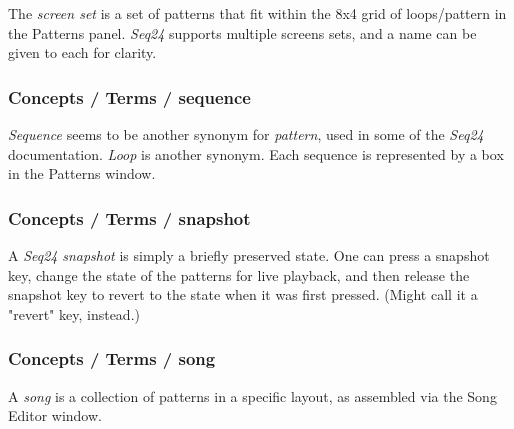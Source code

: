    The \textsl{screen set}
   is a set of patterns that fit within the 8x4 grid of loops/pattern in the
   Patterns panel.
   \textsl{Seq24} supports multiple screens sets, and a name can be given to
   each for clarity.

\subsubsection{Concepts / Terms / sequence}
\label{subsubsec:concepts_terms_sequence}

   \textsl{Sequence} seems to be
   another synonym for \textsl{pattern}, used in some of the \textsl{Seq24}
   documentation.  \textsl{Loop} is another synonym.
   Each sequence is represented by a box in the Patterns window.

\subsubsection{Concepts / Terms / snapshot}
\label{subsubsec:concepts_terms_snapshot}

   A \textsl{Seq24} \textsl{snapshot} is simply a briefly preserved state.
   One can press a snapshot key, change the state of the patterns for live
   playback, and then release the snapshot key to revert to the state when
   it was first pressed.  (Might call it a "revert" key, instead.)

\subsubsection{Concepts / Terms / song}
\label{subsubsec:concepts_terms_song}

   A \textsl{song} is a collection of patterns in a specific layout, as
   assembled via the Song Editor window.

